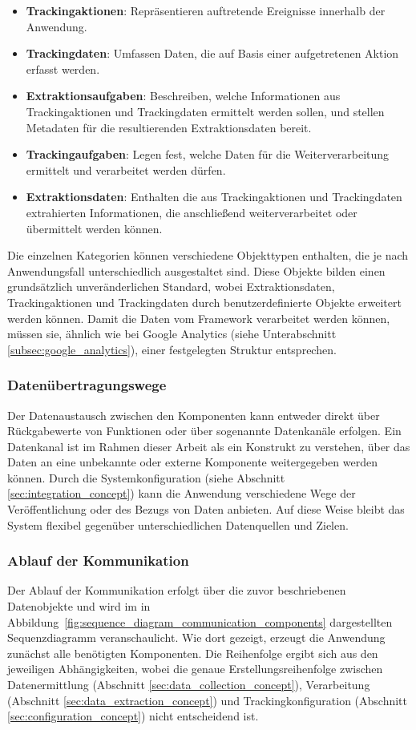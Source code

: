 \begin{itemize}
    \item \textbf{Trackingaktionen}: Repräsentieren auftretende Ereignisse innerhalb der Anwendung.
    \item \textbf{Trackingdaten}: Umfassen Daten, die auf Basis einer aufgetretenen Aktion erfasst werden.
    \item \textbf{Extraktionsaufgaben}: Beschreiben, welche Informationen aus Trackingaktionen und Trackingdaten ermittelt werden sollen, und stellen Metadaten für die resultierenden Extraktionsdaten bereit.
    \item \textbf{Trackingaufgaben}: Legen fest, welche Daten für die Weiterverarbeitung ermittelt und verarbeitet werden dürfen.
    \item \textbf{Extraktionsdaten}: Enthalten die aus Trackingaktionen und Trackingdaten extrahierten Informationen, die anschließend weiterverarbeitet oder übermittelt werden können.
\end{itemize}

Die einzelnen Kategorien können verschiedene Objekttypen enthalten, die je nach Anwendungsfall unterschiedlich ausgestaltet sind. Diese Objekte bilden einen grundsätzlich unveränderlichen Standard, wobei Extraktionsdaten, Trackingaktionen und Trackingdaten durch benutzerdefinierte Objekte erweitert werden können. Damit die Daten vom Framework verarbeitet werden können, müssen sie, ähnlich wie bei Google Analytics (siehe Unterabschnitt \ref{subsec:google_analytics}), einer festgelegten Struktur entsprechen.

\subsubsection{Datenübertragungswege}
Der Datenaustausch zwischen den Komponenten kann entweder direkt über Rückgabewerte von Funktionen oder über sogenannte Datenkanäle erfolgen.  
Ein Datenkanal ist im Rahmen dieser Arbeit als ein Konstrukt zu verstehen, über das Daten an eine unbekannte oder externe Komponente weitergegeben werden können.  
Durch die Systemkonfiguration (siehe Abschnitt \ref{sec:integration_concept}) kann die Anwendung verschiedene Wege der Veröffentlichung oder des Bezugs von Daten anbieten. Auf diese Weise bleibt das System flexibel gegenüber unterschiedlichen Datenquellen und Zielen.

\subsubsection{Ablauf der Kommunikation}
Der Ablauf der Kommunikation erfolgt über die zuvor beschriebenen Datenobjekte und wird im in Abbildung~\ref{fig:sequence_diagram_communication_components} dargestellten Sequenzdiagramm veranschaulicht.  
Wie dort gezeigt, erzeugt die Anwendung zunächst alle benötigten Komponenten. Die Reihenfolge ergibt sich aus den jeweiligen Abhängigkeiten, wobei die genaue Erstellungsreihenfolge zwischen Datenermittlung (Abschnitt \ref{sec:data_collection_concept}), Verarbeitung (Abschnitt \ref{sec:data_extraction_concept}) und Trackingkonfiguration (Abschnitt \ref{sec:configuration_concept}) nicht entscheidend ist.  

